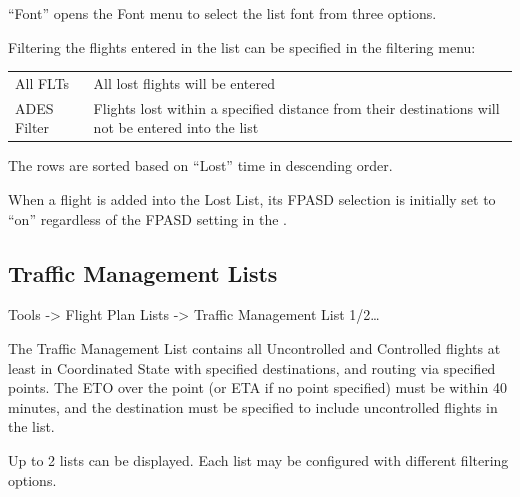 \documentclass[a4paper,oneside,11pt]{memoir}
\begin{document}
“Font” opens the Font menu to select the list font from three options.

\bigskip

Filtering the flights entered in the list can be specified in the filtering menu:

\begin{longtable}{p{5cm} p{7.5cm}}
  All FLTs    & All lost flights will be entered\\
  ADES Filter & Flights lost within a specified distance from their destinations will not be entered into the list\\
\end{longtable}

\bigskip

The rows are sorted based on “Lost” time in descending order.

\bigskip

When a flight is added into the Lost List, its FPASD selection is initially set to “on” regardless of the FPASD setting in the .

\subsection{Traffic Management Lists}
\label{list:tml}

 Tools -> Flight Plan Lists -> Traffic Management List 1/2…

\bigskip

The Traffic Management List contains all Uncontrolled and Controlled flights at least in Coordinated State with specified destinations, and routing via specified points. The ETO over the point (or ETA if no point specified) must be within 40 minutes, and the destination must be specified to include uncontrolled flights in the list.

\bigskip

Up to 2 lists can be displayed. Each list may be configured with different filtering options.
\end{document}
